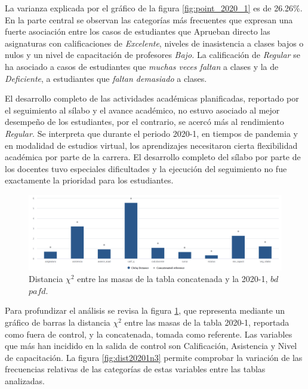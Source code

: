 \documentclass[mathematics,article,submit,moreauthors,pdftex]{mdpi}
\begin{document}
La varianza explicada por el gráfico de la figura \ref{fig:point_2020_1}
es de 26.26\%. En la parte central se observan las categorías más
frecuentes que expresan una fuerte asociación entre los casos de
estudiantes que Aprueban directo las asignaturas con calificaciones de
\emph{Excelente}, niveles de inasistencia a clases bajos o nulos y un
nivel de capacitación de profesores \emph{Bajo.} La calificación de
\emph{Regular} se ha asociado a casos de estudiantes que \emph{muchas
veces faltan} a clases y la de \emph{Deficiente}, a estudiantes que
\emph{faltan demasiado} a clases.

El desarrollo completo de las actividades académicas planificadas,
reportado por el seguimiento al sílabo y el avance académico, no estuvo
asociado al mejor desempeño de los estudiantes, por el contrario, se
acercó más al rendimiento \emph{Regular.} Se interpreta que durante el
periodo 2020-1, en tiempos de pandemia y en modalidad de estudios
virtual, los aprendizajes necesitaron cierta flexibilidad académica por
parte de la carrera. El desarrollo completo del sílabo por parte de los
docentes tuvo especiales dificultades y la ejecución del seguimiento no
fue exactamente la prioridad para los estudiantes.

\begin{figure}[H]


\begin{center}\includegraphics[width=0.9\linewidth,]{chisq_2020_1} \end{center}

\caption{Distancia $\chi^{2}$ entre las masas de la tabla concatenada y la 2020-1, $bd$ $pafd$.}
\label{fig:chi_2020_1}
\end{figure}

Para profundizar el análisis se revisa la figura \ref{fig:chi_2020_1},
que representa mediante un gráfico de barras la distancia \(\chi^2\)
entre las masas de la tabla 2020-1, reportada como fuera de control, y
la concatenada, tomada como referente. Las variables que más han
incidido en la salida de control son Calificación, Asistencia y Nivel de
capacitación. La figura \ref{fig:dist20201n3} permite comprobar la
variación de las frecuencias relativas de las categorías de estas
variables entre las tablas analizadas.
\end{document}
